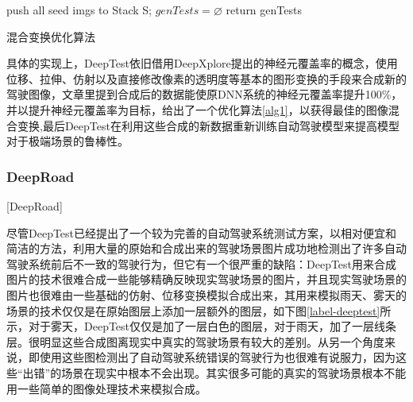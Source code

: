 \begin{algorithm}[h]
    \small
    \SetAlgoLined


    push all seed imgs to Stack S;\;
    $genTests = \varnothing$\;
    return genTests
    \caption{混合变换优化算法\cite{DeepTest}}
    \label{alg1}
\end{algorithm}

具体的实现上，DeepTest依旧借用DeepXplore提出的神经元覆盖率的概念，使用位移、拉伸、仿射以及直接修改像素的透明度等基本的图形变换的手段来合成新的驾驶图像，文章里提到合成后的数据能使原DNN系统的神经元覆盖率提升100\%\cite{DeepTest}，并以提升神经元覆盖率为目标，给出了一个优化算法\ref{alg1}，以获得最佳的图像混合变换,最后DeepTest在利用这些合成的新数据重新训练自动驾驶模型来提高模型对于极端场景的鲁棒性。

\subsubsection{DeepRoad}[DeepRoad]

尽管DeepTest已经提出了一个较为完善的自动驾驶系统测试方案，以相对便宜和简洁的方法，利用大量的原始和合成出来的驾驶场景图片成功地检测出了许多自动驾驶系统前后不一致的驾驶行为，但它有一个很严重的缺陷：DeepTest用来合成图片的技术很难合成一些能够精确反映现实驾驶场景的图片，并且现实驾驶场景的图片也很难由一些基础的仿射、位移变换模拟合成出来，其用来模拟雨天、雾天的场景的技术仅仅是在原始图层上添加一层额外的图层，如下图\ref{label-deeptest}所示，对于雾天，DeepTest仅仅是加了一层白色的图层，对于雨天，加了一层线条层。很明显这些合成图离现实中真实的驾驶场景有较大的差别。从另一个角度来说，即使用这些图检测出了自动驾驶系统错误的驾驶行为也很难有说服力，因为这些“出错”的场景在现实中根本不会出现。其实很多可能的真实的驾驶场景根本不能用一些简单的图像处理技术来模拟合成。

